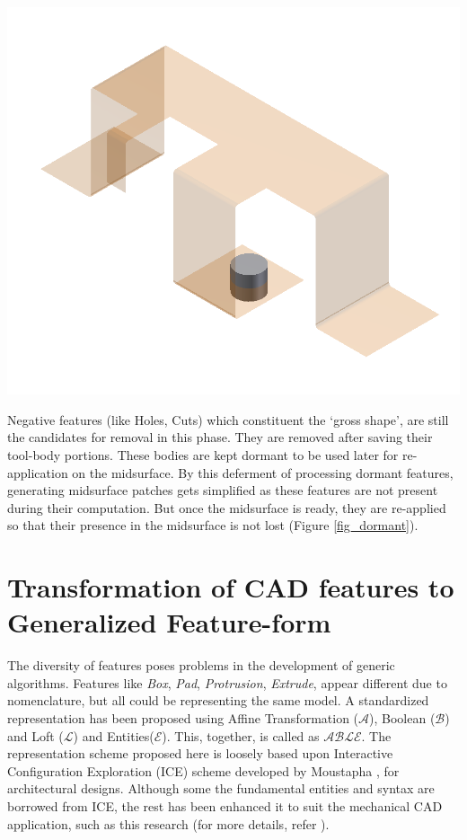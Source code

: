 \begin{minipage}{0.95\textwidth}
\begin{minipage}[c]{0.42\linewidth}
\includegraphics[width=0.75\linewidth,valign=t]{../Common/images/dormant}
 \label{fig_dormant}
\end{minipage}
\hfill
\begin{minipage}[c]{0.56\linewidth}
Negative features (like Holes, Cuts) which constituent the `gross shape', are still the candidates for removal in this phase. They are removed after saving their tool-body portions. These bodies are kept dormant to be used later for re-application on the midsurface. By this deferment of processing dormant features, generating midsurface patches gets simplified as these features are not present during their computation. But once the midsurface is ready, they are re-applied so that their presence in the midsurface is not lost  (Figure \ref{fig_dormant}).%
\end{minipage}

\end{minipage}

\section{Transformation of CAD features to Generalized Feature-form}  \label{cagd:sec:abstraction}
The diversity of features poses problems in the development of generic algorithms. Features like {\em Box}, {\em Pad}, {\em Protrusion}, {\em Extrude}, appear different due to nomenclature, but all could be representing the same model. A standardized representation has been proposed using Affine Transformation ($\mathcal{A}$),  Boolean ($\mathcal{B}$) and Loft ($\mathcal{L}$) and Entities($\mathcal{E}$).  This, together, is called as {\bf $\mathcal{ABLE}$}. The representation scheme proposed here is loosely based upon Interactive Configuration Exploration  (ICE) scheme developed by Moustapha \cite{Hoda2005}, for architectural designs. Although some the fundamental entities and syntax are borrowed from ICE, the rest has been enhanced it to suit the mechanical CAD application, such as this research (for more details, refer \cite{YogeshIITG2014}).  


